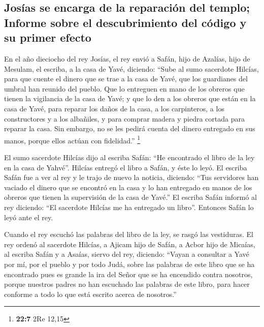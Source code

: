 \begin{paracol}{2}
\hypertarget{josuxedas-se-encarga-de-la-reparaciuxf3n-del-templo-informe-sobre-el-descubrimiento-del-cuxf3digo-y-su-primer-efecto}{%
\subsection{Josías se encarga de la reparación del templo; Informe sobre
el descubrimiento del código y su primer
efecto}\label{josuxedas-se-encarga-de-la-reparaciuxf3n-del-templo-informe-sobre-el-descubrimiento-del-cuxf3digo-y-su-primer-efecto}}

 En el año dieciocho del rey Josías, el rey envió a Safán,
hijo de Azalías, hijo de Mesulam, el escriba, a la casa de Yavé,
diciendo:  ``Sube al sumo sacerdote Hilcías, para que
cuente el dinero que se trae a la casa de Yavé, que los guardianes del
umbral han reunido del pueblo.  Que lo entreguen en mano
de los obreros que tienen la vigilancia de la casa de Yavé; y que lo den
a los obreros que están en la casa de Yavé, para reparar los daños de la
casa,  a los carpinteros, a los constructores y a los
albañiles, y para comprar madera y piedra cortada para reparar la casa.
 Sin embargo, no se les pedirá cuenta del dinero entregado
en sus manos, porque ellos actúan con fidelidad.'' \footnote{\textbf{22:7}
  2Re 12,15}

 El sumo sacerdote Hilcías dijo al escriba Safán: ``He
encontrado el libro de la ley en la casa de Yahvé''. Hilcías entregó el
libro a Safán, y éste lo leyó.  El escriba Safán fue a ver
al rey y le trajo de nuevo la noticia, diciendo: ``Tus servidores han
vaciado el dinero que se encontró en la casa y lo han entregado en manos
de los obreros que tienen la supervisión de la casa de Yavé.''
 El escriba Safán informó al rey diciendo: ``El sacerdote
Hilcías me ha entregado un libro''. Entonces Safán lo leyó ante el rey.

 Cuando el rey escuchó las palabras del libro de la ley,
se rasgó las vestiduras.  El rey ordenó al sacerdote
Hilcías, a Ajicam hijo de Safán, a Acbor hijo de Micaías, al escriba
Safán y a Asaías, siervo del rey, diciendo:  ``Vayan a
consultar a Yavé por mí, por el pueblo y por todo Judá, sobre las
palabras de este libro que se ha encontrado pues es grande la ira del
Señor que se ha encendido contra nosotros, porque nuestros padres no han
escuchado las palabras de este libro, para hacer conforme a todo lo que
está escrito acerca de nosotros.''


\end{paracol}
